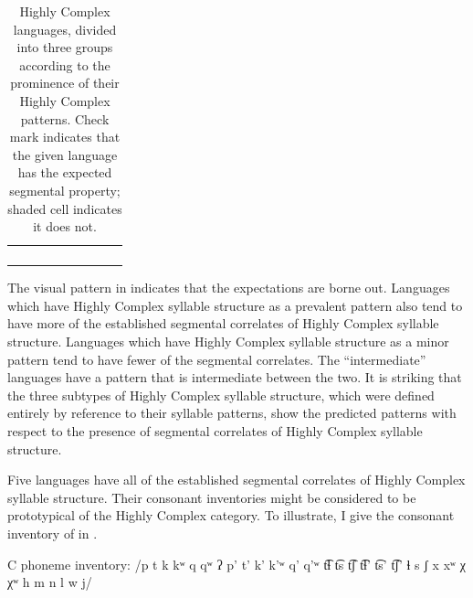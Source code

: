\begin{table}
\begin{tabularx}{\textwidth}{lCCCCCCCC}
  &  &  &  &  &  &  &  & \\
  &  &  &  &  &  &  &  & \\
  &  &  &  &  &  &  &  & \\
\lspbottomrule
\end{tabularx}
\caption{\label{tab:4.16}Highly Complex languages, divided into three groups according to the prominence of their Highly Complex patterns. Check mark indicates that the given language has the expected segmental property; shaded cell indicates it does not.}
\end{table}

  The visual pattern in  indicates that the expectations are borne out. Languages which have Highly Complex syllable structure as a prevalent pattern also tend to have more of the established segmental correlates of Highly Complex syllable structure. Languages which have Highly Complex syllable structure as a minor pattern tend to have fewer of the segmental correlates. The ``intermediate'' languages have a pattern that is intermediate between the two. It is striking that the three subtypes of Highly Complex syllable structure, which were defined entirely by reference to their syllable patterns, show the predicted patterns with respect to the presence of segmental correlates of Highly Complex syllable structure.

  Five languages have all of the established segmental correlates of Highly Complex syllable structure. Their consonant inventories might be considered to be prototypical of the Highly Complex category. To illustrate, I give the consonant inventory of  in .

\ea\label{ex:4.35}
\begin{Coding}
\item[C phoneme inventory:] /p t k kʷ q qʷ ʔ p’ t’ k’ k’ʷ q’ q’ʷ t͡ɬ t͡s t͡ʃ t͡ɬ’ t͡s’ t͡ʃ’ ɬ s ʃ x xʷ χ χʷ h m n l w j/
\end{Coding}
\z

